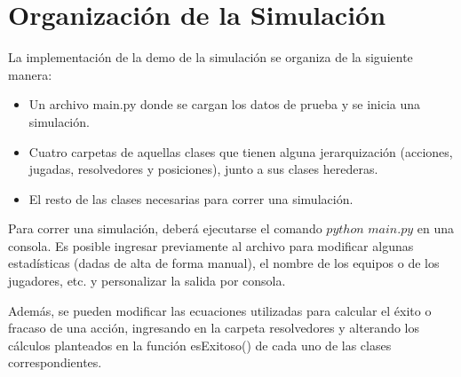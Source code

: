 \section{Organización de la Simulación}
La implementación de la demo de la simulación se organiza de la siguiente manera:
\begin{itemize}
 \item Un archivo main.py donde se cargan los datos de prueba y se inicia una simulación.
 \item Cuatro carpetas de aquellas clases que tienen alguna jerarquización (acciones, jugadas, resolvedores y posiciones), junto a sus clases herederas.
 \item El resto de las clases necesarias para correr una simulación.
\end{itemize}

Para correr una simulación, deberá ejecutarse el comando $python$ $main.py$ en una consola. Es posible ingresar previamente al archivo para modificar algunas estadísticas (dadas de alta de forma manual), el nombre de los equipos o de los jugadores, etc. y personalizar la salida por consola.

Además, se pueden modificar las ecuaciones utilizadas para calcular el éxito o fracaso de una acción, ingresando en la carpeta resolvedores y alterando los cálculos planteados en la función esExitoso() de cada uno de las clases correspondientes. 
